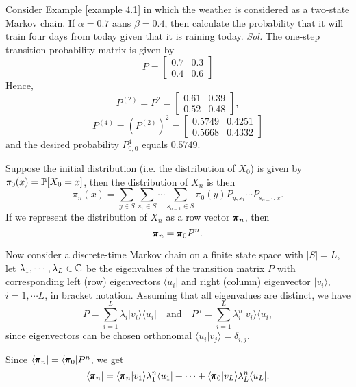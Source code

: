 \begin{example} \label{example 4.8}
    Consider Example \ref{example 4.1} in which the weather is considered as a two-state Markov chain. If $\alpha = 0.7$ aans $\beta = 0.4$, then calculate the probability that it will train four days from today given that it is raining today.
    \textit{Sol.} The one-step transition probability matrix is given by 
    $$
    P = 
    \begin{bmatrix}
        0.7 & 0.3 \\ 
        0.4 & 0.6
    \end{bmatrix}
    $$
    Hence, 
    $$
    P^{(2)} = P^2 = 
    \begin{bmatrix}
        0.61 & 0.39 \\ 
        0.52 & 0.48 
    \end{bmatrix},
    $$
    $$
    P^{(4)} = (P^{(2)})^2 = 
    \begin{bmatrix}
        0.5749 & 0.4251 \\ 
        0.5668 & 0.4332
    \end{bmatrix}
    $$
    and the desired probability $P^4_{0,0}$ equals $0.5749$.
\end{example}

\begin{remark}
    Suppose the initial distribution (i.e. the distribution of $X_0$) is given by $\pi_0(x) = \mathbb{P} [X_0 = x]$, then the distribution of $X_n$ is then 
    $$
    \pi_n(x) = \sum_{y \in S} \sum_{s_1 \in S} \cdots \sum_{s_{n-1} \in S} \pi_0(y) P_{y, s_1} \cdots P_{s_{n-1}, x}.
    $$
    If we represent the distribution of $X_n$ as a row vector $\pmb{\pi}_n$, then 
    $$
    \pmb{\pi}_n = \pmb{\pi}_0 P^n.$$
\end{remark}

Now consider a discrete-time Markov chain on a finite state space with $|S| = L$, let $\lambda_1, \cdots, \lambda_L \in \mathbb{C}$ be the eigenvalues of the transition matrix $P$ with corresponding left (row) eigenvectors $\langle u_i |$ and right (column) eigenvector $|v_i \rangle$, $i = 1, \cdots L$, in bracket notation. Assuming that all eigenvalues are distinct, we have 
$$
P = \sum_{i = 1}^L \lambda_i |v_i\rangle \langle u_i | \quad \text{and} \quad P^n = \sum_{i = 1}^L\lambda_i^n |v_i \rangle \langle u_i,$$
since eigenvectors can be chosen orthonomal $\langle u_i | v_j \rangle = \delta_{i,j}.$

Since $\langle \pmb{\pi}_n | = \langle \pmb{\pi}_0 | P^n$, we get 
$$
\langle \pmb{\pi}_n | = \langle \pmb{\pi}_n | v_1 \rangle \lambda_1^n \langle u_1 | + \cdots + \langle \pmb{\pi}_0 | v_L \rangle \lambda_L^n \langle u_L |.
$$

